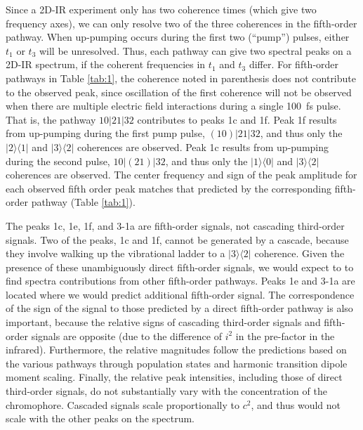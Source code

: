 \documentclass[%
  class = book,%
  crop = false,%
  float = true,%
  multi = true,%
  preview = false,%
]{standalone}
\let\cite\autocite
\begin{document}
{Since a 2D-IR experiment only has two coherence times (which give two frequency axes), we can only resolve two of the three coherences in the fifth-order pathway. When up-pumping occurs during the first two (``pump'') pulses, either \(t_1\) or \(t_3\) will be unresolved. Thus, each pathway can give two spectral peaks on a 2D-IR spectrum, if the coherent frequencies in \(t_1\) and \(t_3\) differ.  For fifth-order pathways in Table \ref{tab:1}, the coherence noted in parenthesis does not contribute to the observed peak, since oscillation of the first coherence will not be observed when there are multiple electric field interactions during a single \SI{100}{\fs} pulse. That is, the pathway \(10|21|32\) contributes to peaks 1c and 1f. Peak 1f results from up-pumping during the first pump pulse, \(\left(10\right)|21|32\), and thus only the \(|2\rangle\langle1|\) and \(|3\rangle\langle2|\) coherences are observed. Peak 1c results from up-pumping during the second pulse, \(10|\left(21\right)|32\), and thus only the \(|1\rangle\langle0|\) and \(|3\rangle\langle2|\) coherences are observed. The center frequency and sign of the peak amplitude for each observed fifth order peak matches that predicted by the corresponding fifth-order pathway (Table \ref{tab:1}).

The peaks 1c, 1e, 1f, and 3-1a are fifth-order signals, not cascading third-order signals. Two of the peaks, 1c and 1f, cannot be generated by a cascade, because they involve walking up the vibrational ladder to a \(|3\rangle\langle2|\) coherence. Given the presence of these unambiguously direct fifth-order signals, we would expect to to find spectra contributions from other fifth-order pathways. Peaks 1e and 3-1a are located where we would predict additional fifth-order signal. The correspondence of the sign of the signal to those predicted by a direct fifth-order pathway is also important, because the relative signs of cascading third-order signals and fifth-order signals are opposite (due to the difference of \(i^2\) in the pre-factor in the infrared). Furthermore, the relative magnitudes follow the predictions based on the various pathways through population states and harmonic transition dipole moment scaling.\cite{Garrett-Roe2009b} Finally, the relative peak intensities, including those of direct third-order signals, do not substantially vary with the concentration of the chromophore. Cascaded signals scale proportionally to \(c^2\), and thus would not scale with the other peaks on the spectrum.

}
\end{document}

